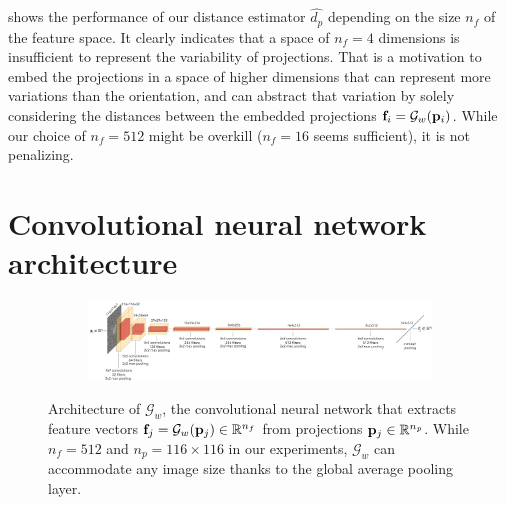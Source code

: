  shows the performance of our distance estimator $\widehat{d_p}$ depending on the size $n_f$ of the feature space.
It clearly indicates that a space of $n_f=4$ dimensions is insufficient to represent the variability of projections.
That is a motivation to embed the projections in a space of higher dimensions that can represent more variations than the orientation, and can abstract that variation by solely considering the distances between the embedded projections $\mathbf{f}_i = \mathcal{G}_w(\mathbf{p}_i)$.
While our choice of $n_f=512$ might be overkill ($n_f=16$ seems sufficient), it is not penalizing.

\section{Convolutional neural network architecture}\label{apx:siamese-architecture}

\begin{figure}[ht!]
    \centering
    \begin{subfigure}[t]{1.0\linewidth}
        \includegraphics[width=\linewidth]{figures/architecture2.pdf}
    \end{subfigure}
    \caption{%
        Architecture of $\mathcal{G}_w$, the convolutional neural network that extracts feature vectors $\mathbf{f}_j = \mathcal{G}_w(\mathbf{p}_j) \in \mathbb{R}^{n_f}$ from projections $\mathbf{p}_j \in \mathbb{R}^{n_p}$.
        While $n_f=512$ and $n_p=116 \times 116$ in our experiments, $\mathcal{G}_w$ can accommodate any image size thanks to the global average pooling layer.
    }\label{fig:de-architecture}
\end{figure}
